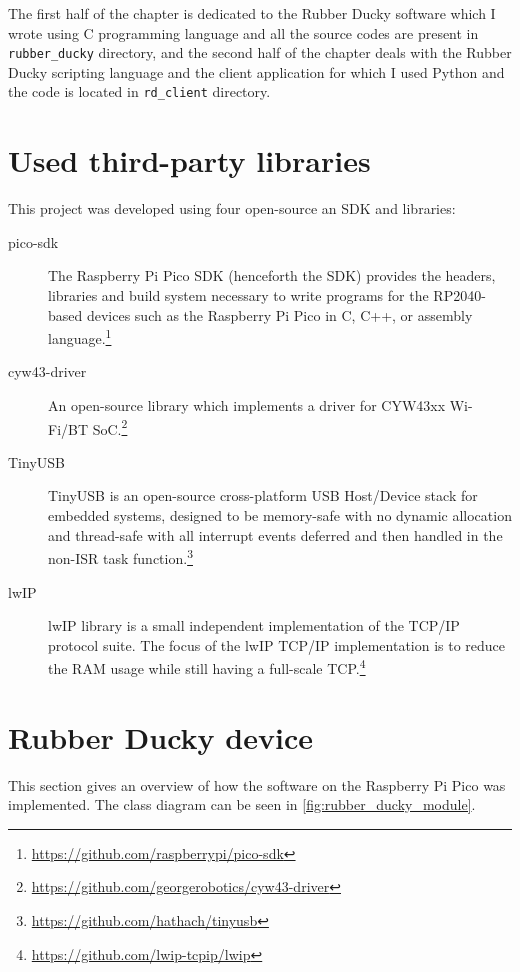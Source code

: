 The first half of the chapter is dedicated to the Rubber Ducky software which I wrote using C programming language and all the source codes are present in \verb|rubber_ducky| directory, and the second half of the chapter deals with the Rubber Ducky scripting language and the client application for which I used Python and the code is located in \verb|rd_client| directory.

\section{Used third-party libraries}
\label{sec:implementation_libraries}
This project was developed using four open-source an SDK and libraries:
\begin{description}
    \item [pico-sdk] The Raspberry Pi Pico SDK (henceforth the SDK) provides the headers, libraries and build system necessary to write programs for the RP2040-based devices such as the Raspberry Pi Pico in C, C++, or assembly language.\footnote{\url{https://github.com/raspberrypi/pico-sdk}}
    \item [cyw43-driver] An open-source library which implements a driver for CYW43xx Wi-Fi/BT SoC.\footnote{\url{https://github.com/georgerobotics/cyw43-driver}}
    \item [TinyUSB] TinyUSB is an open-source cross-platform USB Host/Device stack for embedded systems, designed to be memory-safe with no dynamic allocation and thread-safe with all interrupt events deferred and then handled in the non-ISR task function.\footnote{\url{https://github.com/hathach/tinyusb}}
    \item [lwIP] lwIP library is a small independent implementation of the TCP/IP protocol suite. The focus of the lwIP TCP/IP implementation is to reduce the RAM usage while still having a full-scale TCP.\footnote{\url{https://github.com/lwip-tcpip/lwip}}
\end{description}

\section{Rubber Ducky device}
\label{sec:implementation_rubber_ducky}
This section gives an overview of how the software on the Raspberry Pi Pico was implemented. The class diagram can be seen in \autoref{fig:rubber_ducky_module}.


